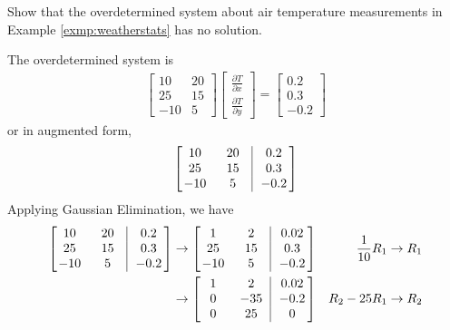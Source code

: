 \begin{exmp}
\label{exmp:weatherstats2}
Show that the overdetermined system about air temperature measurements in Example \ref{exmp:weatherstats} has no solution.
\end{exmp}
\begin{solution}
The overdetermined system is
\begin{align*}
\begin{bmatrix}
10 & 20 \\
25 & 15 \\
-10 & 5
\end{bmatrix}
\begin{bmatrix}
\frac{\partial T}{\partial x} \\
\frac{\partial T}{\partial y} 
\end{bmatrix}
=
\begin{bmatrix}
0.2 \\
0.3 \\
-0.2
\end{bmatrix}
\end{align*}
or in augmented form,
\begin{align*}
\left[\begin{array}{@{}wc{20pt}wc{20pt}|wc{24pt}@{}}    
10 & 20 & 0.2 \\
25 & 15 & 0.3 \\
-10 & 5 & -0.2
\end{array}\right]
\end{align*}
Applying Gaussian Elimination, we have
\begin{align*}
\left[\begin{array}{@{}wc{20pt}wc{20pt}|wc{24pt}@{}}  
10 & 20 & 0.2 \\
25 & 15 & 0.3 \\
-10 & 5 & -0.2
\end{array}\right]
&\to 
\left[\begin{array}{@{}wc{20pt}wc{20pt}|wc{24pt}@{}}   
1 & 2 & 0.02 \\
25 & 15 & 0.3 \\
-10 & 5 & -0.2
\end{array}\right]
& \frac{1}{10} R_1 \to R_1 \\
&\to 
\left[\begin{array}{@{}wc{20pt}wc{20pt}|wc{24pt}@{}}    
1 & 2 & 0.02 \\
0 & -35 & -0.2 \\
0 & 25 & 0
\end{array}\right]
& \begin{aligned}
R_2 - 25R_1 \to R_2 \\

\end{aligned}
\end{align*}
\end{solution}
